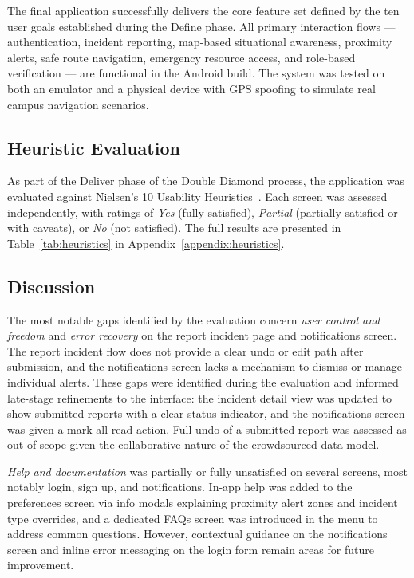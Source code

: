 \documentclass[sigconf]{acmart}
\begin{document}
The final application successfully delivers the core feature set defined by the ten user goals established during the Define phase. All primary interaction flows --- authentication, incident reporting, map-based situational awareness, proximity alerts, safe route navigation, emergency resource access, and role-based verification --- are functional in the Android build. The system was tested on both an emulator and a physical device with GPS spoofing to simulate real campus navigation scenarios.
 
\subsection{Heuristic Evaluation}
 
As part of the Deliver phase of the Double Diamond process, the application was evaluated against Nielsen's 10 Usability Heuristics~\cite{nielsen1994usability}. Each screen was assessed independently, with ratings of \textit{Yes} (fully satisfied), \textit{Partial} (partially satisfied or with caveats), or \textit{No} (not satisfied). The full results are presented in Table~\ref{tab:heuristics} in Appendix~\ref{appendix:heuristics}.
 \subsection{Discussion}
 
The most notable gaps identified by the evaluation concern \textit{user control and freedom} and \textit{error recovery} on the report incident page and notifications screen. The report incident flow does not provide a clear undo or edit path after submission, and the notifications screen lacks a mechanism to dismiss or manage individual alerts. These gaps were identified during the evaluation and informed late-stage refinements to the interface: the incident detail view was updated to show submitted reports with a clear status indicator, and the notifications screen was given a mark-all-read action. Full undo of a submitted report was assessed as out of scope given the collaborative nature of the crowdsourced data model.
 
\textit{Help and documentation} was partially or fully unsatisfied on several screens, most notably login, sign up, and notifications. In-app help was added to the preferences screen via info modals explaining proximity alert zones and incident type overrides, and a dedicated FAQs screen was introduced in the menu to address common questions. However, contextual guidance on the notifications screen and inline error messaging on the login form remain areas for future improvement.
 
\end{document}
